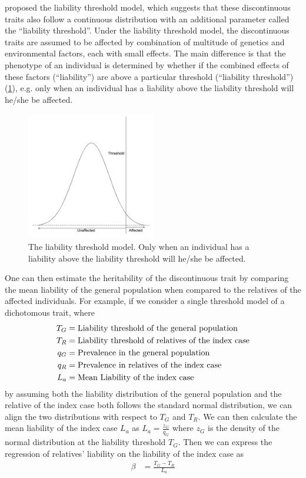\documentclass[12pt]{scrbook}
\begin{document}
	\citet{Falconer1965} proposed the liability threshold model, which suggests that these discontinuous traits also follow a continuous distribution with an additional parameter called the ``liability threshold''.
	Under the liability threshold model, the discontinuous traits are assumed to be affected by combination of multitude of genetics and environmental factors, each with small effects.
	The main difference is that the phenotype of an individual is determined by whether if the combined effects of these factors (``liability'') are above a particular threshold (``liability threshold'') (\cref{fig:liability}), e.g. only when an individual has a liability above the liability threshold will he/she be affected.
	\begin{figure}
		\centering
		\includegraphics[width=0.5\textwidth]{figure/liability.png}
		\caption[Liability Threshold Model]{
			The liability threshold model.
			Only when an individual has a liability above the liability threshold will he/she be affected.
		}
		\label{fig:liability}
	\end{figure}
	One can then estimate the heritability of the discontinuous trait by comparing the mean liability of the general population when compared to the relatives of the affected individuals.	
	For example, if we consider a single threshold model of a dichotomous trait, where 
	\begin{align}
	T_G &= \text{Liability threshold of the general population}\notag\\
	T_R &= \text{Liability threshold of relatives of the index case} \notag\\
	q_G &= \text{Prevalence in the general population}\notag\\
	q_R &= \text{Prevalence in relatives of the index case}\notag\\
	L_a &= \text{Mean Liability of the index case} \notag
	\end{align}
	by assuming both the liability distribution of the general population and the relative of the index case both follows the standard normal distribution, we can align the two distributions with respect to $T_G$ and $T_R$. 
	We can then calculate the mean liability of the index case $L_a$ as $L_a=\frac{z_G}{q_G}$ where $z_G$ is the density of the normal distribution at the liability threshold $T_G$.
	Then we can express the regression of relatives' liability on the liability of the index case as
	\begin{align}
	\beta &= \frac{T_G-T_R}{L_a}
	\label{eq:liability}
	\end{align}
	
\end{document}
